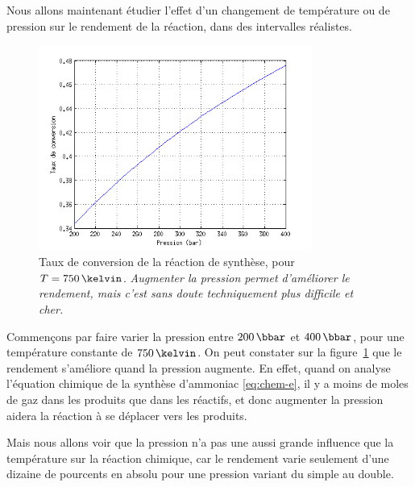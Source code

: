 Nous allons maintenant étudier l'effet d'un changement
de température ou de pression sur le rendement de la réaction,
dans des intervalles réalistes.

\begin{figure}
    \centering
    \includegraphics[width=0.8\textwidth]{img/param-press}
    \caption{
        Taux de conversion de la réaction de synthèse,
        pour $T=750\,\kelvin$.
        \emph{Augmenter la pression permet d'améliorer le rendement,
        mais c'est sans doute techniquement plus difficile et cher.}
    }
    \label{fig:param-press}
\end{figure}

Commençons par faire varier la pression entre $200\,\bbar$ et $400\,\bbar$, pour une température constante de $750\,\kelvin$.
On peut constater sur la figure~\ref{fig:param-press} que le rendement s'améliore quand la pression augmente. En effet, quand on analyse l'équation chimique de la synthèse d'ammoniac \eqref{eq:chem-e}, il y a moins de moles de gaz dans les produits que dans les réactifs, et donc augmenter la pression aidera la réaction à se déplacer vers les produits.

Mais nous allons voir que la pression n'a pas une aussi grande influence que la température sur la réaction chimique, car le rendement varie seulement d'une dizaine de pourcents en absolu pour une pression variant du simple au double.

